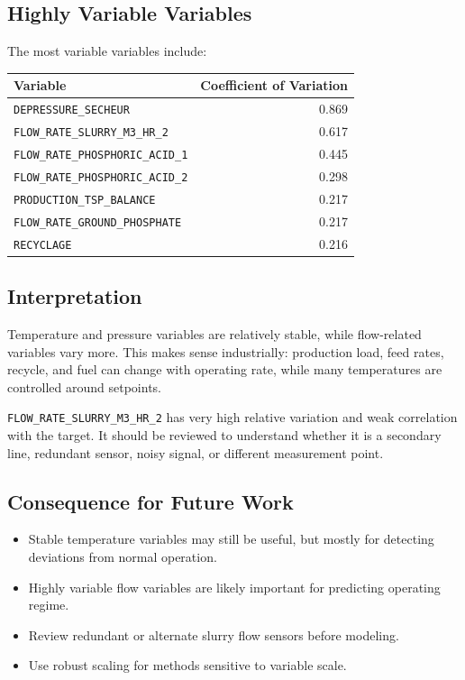 \documentclass[11pt,a4paper]{article}
\begin{document}
\subsection{Highly Variable Variables}

The most variable variables include:

\begin{longtable}{p{8cm}r}
\toprule
Variable & Coefficient of Variation \\
\midrule
\texttt{DEPRESSURE\_SECHEUR} & 0.869 \\
\texttt{FLOW\_RATE\_SLURRY\_M3\_HR\_2} & 0.617 \\
\texttt{FLOW\_RATE\_PHOSPHORIC\_ACID\_1} & 0.445 \\
\texttt{FLOW\_RATE\_PHOSPHORIC\_ACID\_2} & 0.298 \\
\texttt{PRODUCTION\_TSP\_BALANCE} & 0.217 \\
\texttt{FLOW\_RATE\_GROUND\_PHOSPHATE} & 0.217 \\
\texttt{RECYCLAGE} & 0.216 \\
\bottomrule
\end{longtable}

\subsection{Interpretation}

Temperature and pressure variables are relatively stable, while flow-related variables vary more. This makes sense industrially: production load, feed rates, recycle, and fuel can change with operating rate, while many temperatures are controlled around setpoints.

\texttt{FLOW\_RATE\_SLURRY\_M3\_HR\_2} has very high relative variation and weak correlation with the target. It should be reviewed to understand whether it is a secondary line, redundant sensor, noisy signal, or different measurement point.

\subsection{Consequence for Future Work}

\begin{itemize}
    \item Stable temperature variables may still be useful, but mostly for detecting deviations from normal operation.
    \item Highly variable flow variables are likely important for predicting operating regime.
    \item Review redundant or alternate slurry flow sensors before modeling.
    \item Use robust scaling for methods sensitive to variable scale.
\end{itemize}
\end{document}
